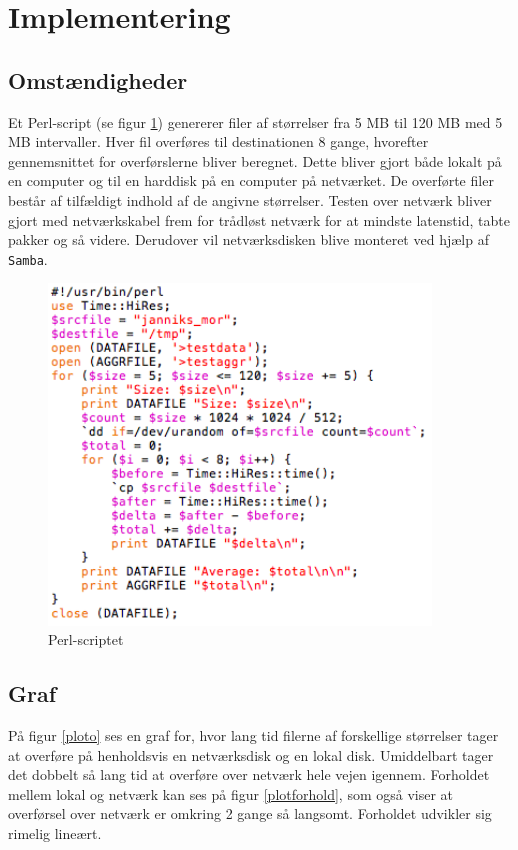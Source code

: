 \documentclass{article}
\begin{document}
\section{Implementering}

\subsection{Omstændigheder}


Et Perl-script (se figur \ref{kode}) genererer filer af størrelser fra 5 MB til 120 MB med 5 MB intervaller. Hver fil overføres til destinationen 8 gange, hvorefter gennemsnittet for overførslerne bliver beregnet. Dette bliver gjort både lokalt på en computer og til en harddisk på en computer på netværket. De overførte filer består af tilfældigt indhold af de angivne størrelser. Testen over netværk bliver gjort med netværkskabel frem for trådløst netværk for at mindste latenstid, tabte pakker og så videre. Derudover vil netværksdisken blive monteret ved hjælp af {\tt Samba}.

\begin{figure}
	\includegraphics[width=4in]{kode.png}
	\caption{Perl-scriptet}
	\label{kode}
\end{figure}

\subsection{Graf}
På figur \ref{ploto} ses en graf for, hvor lang tid filerne af forskellige størrelser tager at overføre på henholdsvis en netværksdisk og en lokal disk. Umiddelbart tager det dobbelt så lang tid at overføre over netværk hele vejen igennem. Forholdet mellem lokal og netværk kan ses på figur \ref{plotforhold}, som også viser at overførsel over netværk er omkring 2 gange så langsomt. Forholdet udvikler sig rimelig lineært.
\end{document}
